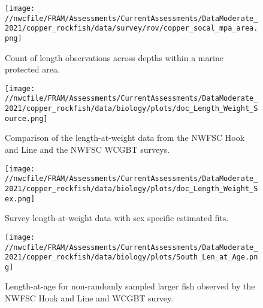 \documentclass[11pt,
  english,
  a4paper,
]{article}
\begin{document}
\begin{figure}
\centering
\texttt{[image: //nwcfile/FRAM/Assessments/CurrentAssessments/DataModerate\_2021/copper\_rockfish/data/survey/rov/copper\_socal\_mpa\_area.png]}
\caption{Count of length observations across depths within a marine protected area.\label{fig:rov-mpa}}
\end{figure}

\tagmcend\tagstructend


\begin{figure}
\centering
\texttt{[image: //nwcfile/FRAM/Assessments/CurrentAssessments/DataModerate\_2021/copper\_rockfish/data/biology/plots/doc\_Length\_Weight\_Source.png]}
\caption{Comparison of the length-at-weight data from the NWFSC Hook and Line and the NWFSC WCGBT surveys.\label{fig:len-weight-survey}}
\end{figure}

\tagmcend\tagstructend


\begin{figure}
\centering
\texttt{[image: //nwcfile/FRAM/Assessments/CurrentAssessments/DataModerate\_2021/copper\_rockfish/data/biology/plots/doc\_Length\_Weight\_Sex.png]}
\caption{Survey length-at-weight data with sex specific estimated fits.\label{fig:len-weight}}
\end{figure}

\tagmcend\tagstructend


\begin{figure}
\centering
\texttt{[image: //nwcfile/FRAM/Assessments/CurrentAssessments/DataModerate\_2021/copper\_rockfish/data/biology/plots/South\_Len\_at\_Age.png]}
\caption{Length-at-age for non-randomly sampled larger fish observed by the NWFSC Hook and Line and WCGBT survey.\label{fig:survey-len-at-age-data}}
\end{figure}
\end{document}
